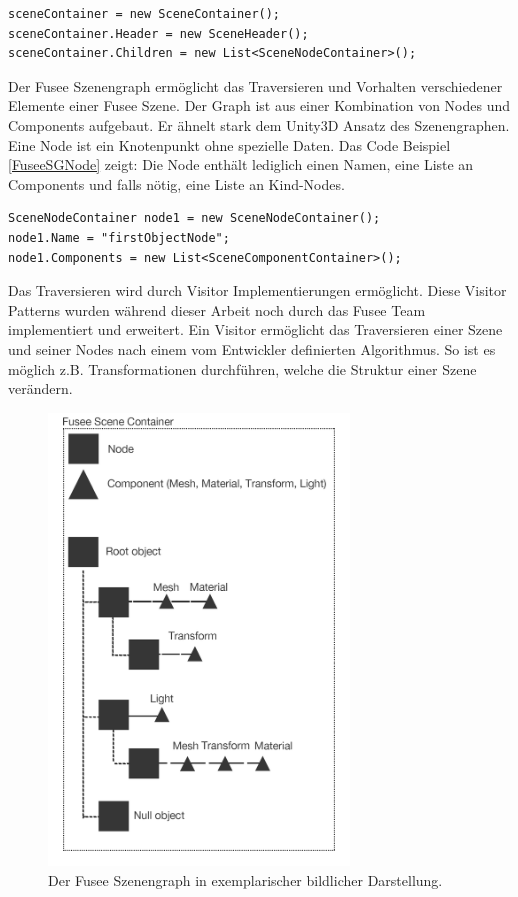 \documentclass[pagesize, paper=a4, fontsize=12pt, titlepage=true, headings=small, headnosepline, abstractoff, liststotoc, nochapterprefix, plainheadsepline, twoside]{scrreprt}
\begin{document}
\begin{lstlisting}[caption = Anlegen eines Fusee SceneContainers und damit Verwendung des Szenengraphen., label=FuseeSGSceneContainer]
sceneContainer = new SceneContainer();
sceneContainer.Header = new SceneHeader();
sceneContainer.Children = new List<SceneNodeContainer>();
\end{lstlisting}

Der Fusee Szenengraph ermöglicht das Traversieren und Vorhalten verschiedener Elemente einer Fusee Szene. Der Graph ist aus einer Kombination von Nodes und Components aufgebaut. Er ähnelt stark dem Unity3D Ansatz des Szenengraphen. Eine Node ist ein Knotenpunkt ohne spezielle Daten. Das Code Beispiel \ref{FuseeSGNode} zeigt: Die Node enthält lediglich einen Namen, eine Liste an Components und falls nötig, eine Liste an Kind-Nodes.

\begin{lstlisting}[caption = Anlegen eines Fusee Node Containers und initialisieren einer Component Liste., label=FuseeSGNode]
SceneNodeContainer node1 = new SceneNodeContainer();
node1.Name = "firstObjectNode";
node1.Components = new List<SceneComponentContainer>();
\end{lstlisting}

Das Traversieren wird durch Visitor Implementierungen ermöglicht. Diese Visitor Patterns wurden während dieser Arbeit noch durch das Fusee Team implementiert und erweitert. Ein Visitor ermöglicht das Traversieren einer Szene und seiner Nodes nach einem vom Entwickler definierten Algorithmus. So ist es möglich z.B. Transformationen durchführen, welche die Struktur einer Szene verändern.

\begin{figure}[ht]
	\centering
	\includegraphics[width=8cm]{Bilder/Fusee_Szenengraph_Vgl.jpg}
	\caption{Der Fusee Szenengraph in exemplarischer bildlicher Darstellung.}
	\label{FuseeSzenenGraph}
\end{figure}
\end{document}
